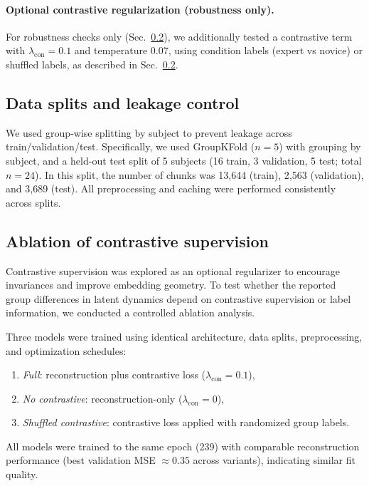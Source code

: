 \documentclass[5p,twocolumn,authoryear]{elsarticle}
\newcommand{\secref}[1]{Sec.~\ref{#1}}
\begin{document}
\paragraph{Optional contrastive regularization (robustness only).}
For robustness checks only (\secref{app:contrastive_ablation}), we additionally tested a contrastive term with $\lambda_{\mathrm{con}}=0.1$ and temperature $0.07$, using condition labels (expert vs novice) or shuffled labels, as described in \secref{app:contrastive_ablation}.

\subsection{Data splits and leakage control}
We used group-wise splitting by subject to prevent leakage across train/validation/test. Specifically, we used GroupKFold ($n=5$) with grouping by subject, and a held-out test split of 5 subjects (16 train, 3 validation, 5 test; total $n=24$). In this split, the number of chunks was 13{,}644 (train), 2{,}563 (validation), and 3{,}689 (test). All preprocessing and caching were performed consistently across splits.

\subsection{Ablation of contrastive supervision}
\label{app:contrastive_ablation}

Contrastive supervision was explored as an optional regularizer to encourage invariances and improve embedding geometry. To test whether the reported group differences in latent dynamics depend on contrastive supervision or label information, we conducted a controlled ablation analysis.

Three models were trained using identical architecture, data splits, preprocessing, and optimization schedules:
\begin{enumerate}
    \item \emph{Full}: reconstruction plus contrastive loss ($\lambda_{\mathrm{con}} = 0.1$),
    \item \emph{No contrastive}: reconstruction-only ($\lambda_{\mathrm{con}} = 0$),
    \item \emph{Shuffled contrastive}: contrastive loss applied with randomized group labels.
\end{enumerate}

All models were trained to the same epoch (239) with comparable reconstruction performance (best validation MSE $\approx 0.35$ across variants), indicating similar fit quality.
\end{document}
